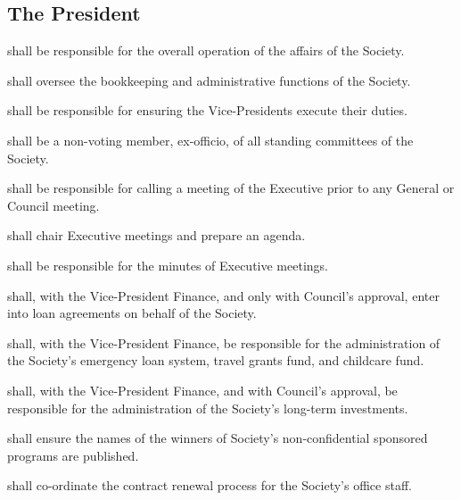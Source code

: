 \subsection {The President}
\begin{longenum}[ label*=\thesubsection.\arabic*., align=left]
	\item shall be responsible for the overall operation of the affairs of the Society.
    \item shall oversee the bookkeeping and administrative functions of the Society. 
    \item shall be responsible for ensuring the Vice-Presidents execute their duties. 
    \item shall be a non-voting member, ex-officio, of all standing committees of the Society.
    \item shall be responsible for calling a meeting of the Executive prior to any General or Council meeting.
    \item shall chair Executive meetings and prepare an agenda.
    \item shall be responsible for the minutes of Executive meetings. 
    \item shall, with the Vice-President Finance, and only with Council's approval, enter into loan agreements on behalf of the Society.
    \item shall, with the Vice-President Finance, be responsible for the administration of the Society's emergency loan system, travel grants fund, and childcare fund. 
    \item shall, with the Vice-President Finance, and with Council's approval, be responsible for the administration of the Society's long-term investments. 
    \item shall ensure the names of the winners of Society's non-confidential sponsored programs are published.
    \item shall co-ordinate the contract renewal process for the Society's office staff. 

\end{longenum}
